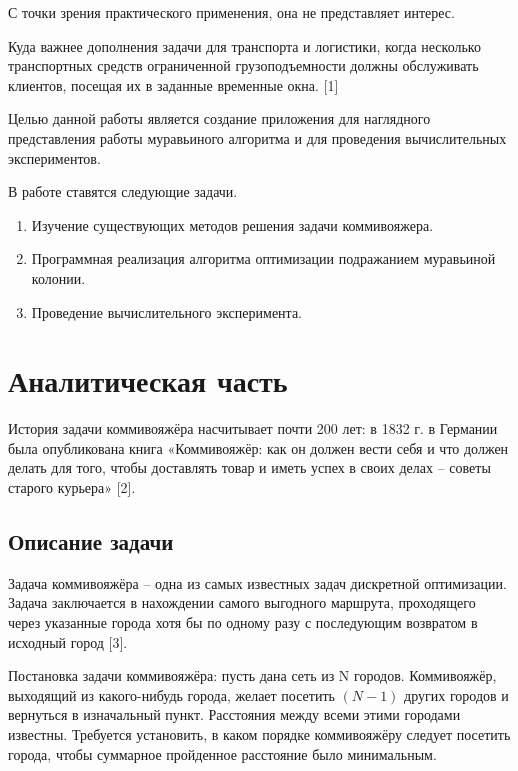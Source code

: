 \documentclass[a4paper,14pt]{article} %
\begin{document}
	 С точки зрения практического применения, она не представляет интерес. 
	 
	 Куда важнее дополнения задачи для транспорта и логистики, когда несколько транспортных средств ограниченной грузоподъемности должны обслуживать клиентов, посещая их в заданные временные окна. [1]
	
	\hfill
	
	Целью данной работы является создание приложения для наглядного представления работы муравьиного алгоритма и для проведения вычислительных экспериментов. 
	
	\hfill

	В работе ставятся следующие задачи. 
	
	\begin{enumerate}
		\item Изучение существующих методов решения задачи коммивояжера. 
		\item Программная реализация алгоритма оптимизации подражанием муравьиной колонии. 	
		\item Проведение вычислительного эксперимента. 
	\end{enumerate}
		
	\newpage


        \section{Аналитическая часть}
        \hfill
        
        История задачи коммивояжёра насчитывает почти 200 лет: в 1832 г. в Германии была опубликована книга «Коммивояжёр: как он должен вести себя и что должен делать для того, чтобы доставлять товар и иметь успех в своих делах -- советы старого курьера» [2].
        
              
        \subsection{Описание задачи}
        \hfill
        
        Задача коммивояжёра -- одна из самых известных задач дискретной оптимизации. Задача заключается в нахождении самого выгодного маршрута, проходящего через указанные города хотя бы по одному разу с последующим возвратом в исходный город [3].
        
       Постановка задачи коммивояжёра: пусть дана сеть из N городов. Коммивояжёр, выходящий из какого-нибудь города, желает посетить $(N-1)$ других городов и вернуться в изначальный пункт. Расстояния между всеми этими городами известны. Требуется установить, в каком порядке коммивояжёру следует посетить города, чтобы суммарное пройденное расстояние было минимальным.
       
\end{document}
